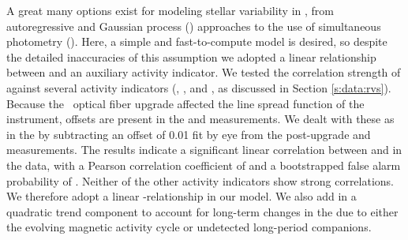 \documentclass[modern]{aastex62}
\begin{document}
A great many options exist for modeling stellar variability in \RVs, from autoregressive and Gaussian process (\GP) approaches to the use of simultaneous photometry (). 
Here, a simple and fast-to-compute model is desired, so despite the detailed inaccuracies of this assumption we adopted a linear relationship between \RV and an auxiliary activity indicator. 
We tested the correlation strength of \RVs against several activity indicators (\BIS, \FWHM, and \shk, as discussed in Section \ref{s:data:rvs}). 
Because the \HARPS\ optical fiber upgrade affected the line spread function of the instrument, offsets are present in the \BIS and \FWHM measurements. 
We dealt with these as in the \RVs by subtracting an offset of 0.01 fit by eye from the post-upgrade \BIS and \FWHM measurements. 
The results indicate a significant linear correlation between \RV and \FWHM in the data, with a Pearson correlation coefficient of  and a bootstrapped false alarm probability of . 
Neither of the other activity indicators show strong correlations. 
We therefore adopt a linear \RV-\FWHM relationship in our model. 
We also add in a quadratic trend component to account for long-term changes in the \RVs due to either the evolving magnetic activity cycle or undetected long-period companions.
\end{document}
